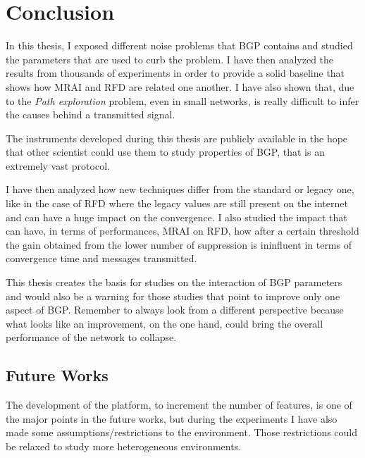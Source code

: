 \chapter{Conclusion}
\label{cha:conclusion}

In this thesis, I exposed different noise problems that \ac{BGP} contains and
studied the parameters that are used to curb the problem.
I have then analyzed the results from thousands of experiments in order to
provide a solid baseline that shows how \ac{MRAI} and \ac{RFD} are related
one another.
I have also shown that, due to the \textit{Path exploration} problem, even
in small networks, is really difficult to infer the causes behind a transmitted
signal.

The instruments developed during this thesis are publicly available in the
hope that other scientist could use them to study properties of \ac{BGP}, that
is an extremely vast protocol.

I have then analyzed how new techniques differ from the standard or legacy one,
like in the case of \ac{RFD} where the legacy values are still present on the
internet and can have a huge impact on the convergence.
I also studied the impact that can have, in terms of performances, \ac{MRAI} on \ac{RFD},
how after a certain threshold the gain obtained from the lower number of
suppression is ininfluent in terms of convergence time and messages transmitted.

This thesis creates the basis for studies on the interaction of \ac{BGP} parameters
and would also be a warning for those studies that point to improve only
one aspect of \ac{BGP}.
Remember to always look from a different perspective because what looks like an
improvement, on the one hand, could bring the overall performance of the
network to collapse.


\section{Future Works}
\label{sec:future_works}

The development of the platform, to increment the number of features, is one of
the major points in the future works, but during the experiments I have also
made some assumptions/restrictions to the environment.
Those restrictions could be relaxed to study more heterogeneous environments.

